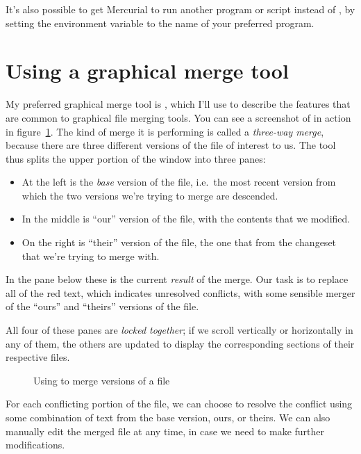 It's also possible to get Mercurial to run another program or script
instead of , by setting the 
environment variable to the name of your preferred program.

\section{Using a graphical merge tool}

My preferred graphical merge tool is , which I'll use
to describe the features that are common to graphical file merging
tools.  You can see a screenshot of  in action in
figure~\ref{fig:tour-merge:kdiff3}.  The kind of merge it is
performing is called a \emph{three-way merge}, because there are three
different versions of the file of interest to us.  The tool thus
splits the upper portion of the window into three panes:
\begin{itemize}
\item At the left is the \emph{base} version of the file, i.e.~the
  most recent version from which the two versions we're trying to
  merge are descended.
\item In the middle is ``our'' version of the file, with the contents
  that we modified.
\item On the right is ``their'' version of the file, the one that
  from the changeset that we're trying to merge with.
\end{itemize}
In the pane below these is the current \emph{result} of the merge.
Our task is to replace all of the red text, which indicates unresolved
conflicts, with some sensible merger of the ``ours'' and ``theirs''
versions of the file.

All four of these panes are \emph{locked together}; if we scroll
vertically or horizontally in any of them, the others are updated to
display the corresponding sections of their respective files.

\begin{figure}[ht]
  \centering
  \caption{Using  to merge versions of a file}
  \label{fig:tour-merge:kdiff3}
\end{figure}

For each conflicting portion of the file, we can choose to resolve
the conflict using some combination of text from the base version,
ours, or theirs.  We can also manually edit the merged file at any
time, in case we need to make further modifications.

